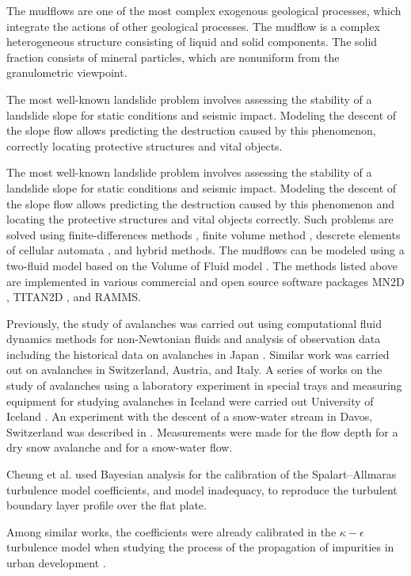 \documentclass[sensors,article,submit,moreauthors,pdftex]{Definitions/mdpi}
\begin{document}
The mudflows are one of the most complex exogenous geological processes, which integrate the actions of other geological processes. The mudflow is a complex heterogeneous structure consisting of liquid and solid components. The solid fraction consists of mineral particles, which are nonuniform from the granulometric viewpoint.

The most well-known landslide problem involves assessing the stability of a landslide slope for static conditions and seismic impact. Modeling the descent of the slope flow allows predicting the destruction caused by this phenomenon, correctly locating protective structures and vital objects.

The most well-known landslide problem involves assessing the stability of a landslide slope for static conditions and seismic impact. Modeling the descent of the slope flow allows predicting the destruction caused by this phenomenon and locating the protective structures and vital objects correctly. Such problems are solved using finite-differences methods \cite{Bernander2016}, finite volume method \cite{liu2007application}, descrete elements \cite{Liu2020} of cellular automata \cite{piegari2006cellular}, and hybrid methods. The mudflows can be modeled using a two-fluid model based on the Volume of Fluid model \cite{Hirt1981}. The methods listed above are implemented in various commercial and open source software packages MN2D \cite{Naaim2002}, TITAN2D \cite{Pitman2003}, and RAMMS.

Previously, the study of avalanches was carried out using computational fluid dynamics methods for non-Newtonian fluids and analysis of observation data including the historical data on avalanches in Japan \cite{Oda2011, Yamaguchi2017}. Similar work was carried out on avalanches in Switzerland, Austria, and Italy. A series of works on the study of avalanches using a laboratory experiment in special trays and measuring equipment for studying avalanches in Iceland were carried out University of Iceland  \cite{IceThesKatr, IceThesJon}. An experiment with the descent of a snow-water stream in Davos, Switzerland was described in \cite{Jaedicke2006}. Measurements were made for the flow depth for a dry snow avalanche and for a snow-water flow.

Cheung et al. \cite{Cheung2011} used Bayesian analysis for the calibration of the Spalart–Allmaras turbulence model coefficients, and model inadequacy, to reproduce the turbulent boundary layer profile over the flat plate. 

Among similar works, the coefficients were already calibrated in the $\kappa-\epsilon$ turbulence model when studying the process of the propagation of impurities in urban development \cite{Guillas2014}.
\end{document}
